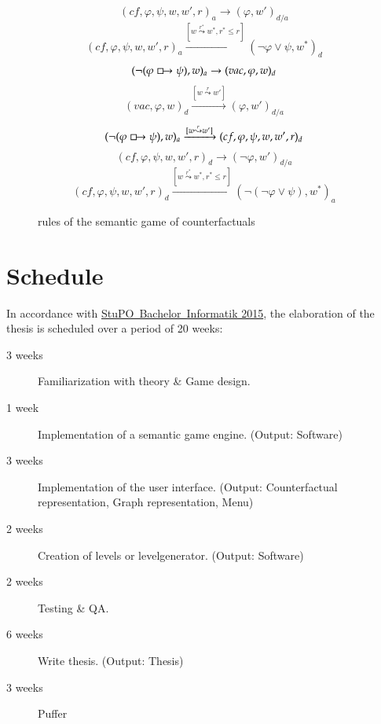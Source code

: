 \documentclass[a4paper,american]{paper}
\begin{document}
\begin{figure}[H]
\begin{equation}
	\end{equation}
	\begin{equation}
		(cf,\varphi ,\psi ,w,w',r)_a\rightarrow (\varphi ,w')_{d/a}
	\end{equation}
	\begin{equation}
		(cf,\varphi ,\psi ,w,w',r)_a\xrightarrow{[w\overset{r^*}{\leadsto}w^*,r^*\leq r]}(\neg\varphi\vee\psi ,w^*)_d
	\end{equation}
	\begin{equation}
		(\neg (\varphi\boxright\psi ),w)_a\rightarrow (vac,\varphi ,w)_d
	\end{equation}
	\begin{equation}
		(vac,\varphi ,w)_d\xrightarrow{[w\overset{r}{\leadsto}w']} (\varphi ,w')_{d/a}
	\end{equation}
	\begin{equation}
		(\neg (\varphi\boxright\psi ),w)_a\xrightarrow{[w\overset{r}{\leadsto}w']}(cf,\varphi ,\psi ,w,w',r)_d
	\end{equation}
	\begin{equation}
		(cf,\varphi ,\psi ,w,w',r)_d\rightarrow(\neg\varphi ,w')_{d/a}
	\end{equation}
	\begin{equation}
		(cf,\varphi ,\psi ,w,w',r)_d\xrightarrow{[w\overset{r^*}{\leadsto}w^*, r^*\leq r]}(\neg(\neg\varphi\vee\psi ),w^*)_a
	\end{equation}
	\caption{rules of the semantic game of counterfactuals}
	\label{fig:rules}
\end{figure}

\section*{Schedule}

In accordance with \href{https://www.eecs.tu-berlin.de/fileadmin/f4/fkIVdokumente/StuPOs/Informatik/Lesefassung_BSc_Informatik.pdf}{StuPO~Bachelor~Informatik 2015}, the elaboration of the thesis is scheduled over a period of 20 weeks:
\begin{description}
\item [3 weeks] Familiarization with theory \& Game design.
\item [1 week] Implementation of a semantic game engine. (Output: Software)
\item [3 weeks] Implementation of the user interface. (Output: Counterfactual representation, Graph representation, Menu)
\item [2 weeks] Creation of levels or levelgenerator. (Output: Software)
\item [2 weeks] Testing \& QA.
\item [6 weeks] Write thesis. (Output: Thesis)
\item [3 weeks] Puffer
\end{description}
\end{document}
